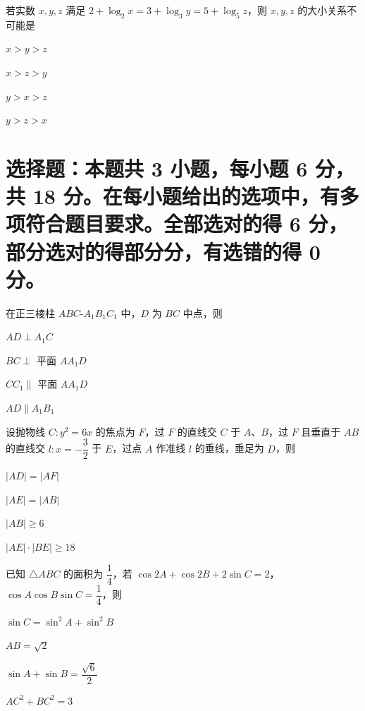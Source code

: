\documentclass{exam-zh}
\begin{document}
\begin{question}
若实数 $x,y,z$ 满足 $2+\log_{2}x=3+\log_{3}y=5+\log_{5}z$，则 $x,y,z$ 的大小关系不可能是 \paren
\begin{choices}
  \item $x>y>z$
  \item $x>z>y$
  \item $y>x>z$
  \item $y>z>x$
\end{choices}
\end{question}

\section{选择题：本题共 3 小题，每小题 6 分，共 18 分。在每小题给出的选项中，有多项符合题目要求。全部选对的得 6 分，部分选对的得部分分，有选错的得 0 分。}

\begin{question}
在正三棱柱 $ABC\text{-}A_{1}B_{1}C_{1}$ 中，$D$ 为 $BC$ 中点，则 \paren
\begin{choices}
  \item $AD\perp A_{1}C$
  \item $BC\perp$ 平面 $AA_{1}D$
  \item $CC_{1}\parallel$ 平面 $AA_{1}D$
  \item $AD\parallel A_{1}B_{1}$
\end{choices}
\end{question}

\begin{question}
设抛物线 $C\colon y^{2}=6x$ 的焦点为 $F$，过 $F$ 的直线交 $C$ 于 $A$、$B$，过 $F$ 且垂直于 $AB$ 的直线交 $l\colon x=-\dfrac{3}{2}$ 于 $E$，过点 $A$ 作准线 $l$ 的垂线，垂足为 $D$，则 \paren
\begin{choices}
  \item $|AD|=|AF|$
  \item $|AE|=|AB|$
  \item $|AB|\ge 6$
  \item $|AE|\cdot|BE|\ge 18$
\end{choices}
\end{question}

\begin{question}
已知 $\triangle ABC$ 的面积为 $\dfrac{1}{4}$，若 $\cos 2A+\cos 2B+2\sin C=2$，$\cos A\cos B\sin C=\dfrac{1}{4}$，则 \paren
\begin{choices}
  \item $\sin C=\sin^{2}A+\sin^{2}B$
  \item $AB=\sqrt{2}$
  \item $\sin A+\sin B=\dfrac{\sqrt{6}}{2}$
  \item $AC^{2}+BC^{2}=3$
\end{choices}
\end{question}
\end{document}
